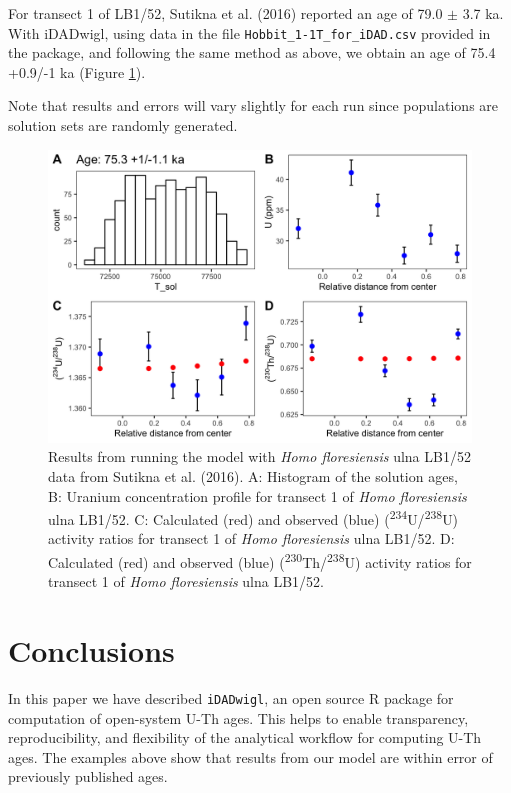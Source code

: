 \documentclass[]{elsarticle} %
\begin{document}
For transect 1 of LB1/52, Sutikna et al. (2016) reported an age of 79.0 \(\pm\) 3.7 ka. With iDADwigl, using data in the file \texttt{Hobbit\_1-1T\_for\_iDAD.csv} provided in the package, and following the same method as above, we obtain an age of 75.4 +0.9/-1 ka (Figure \ref{fig:plot-panel-hobbit-fig}).

Note that results and errors will vary slightly for each run since populations are solution sets are randomly generated.

\newpage



\begin{figure}
\includegraphics[width=0.95\linewidth]{figures/plot-panel-hobbit} \caption{Results from running the model with \emph{Homo floresiensis} ulna LB1/52 data from Sutikna et al. (2016). A: Histogram of the solution ages, B: Uranium concentration profile for transect 1 of \emph{Homo floresiensis} ulna LB1/52. C: Calculated (red) and observed (blue) (\textsuperscript{234}U/\textsuperscript{238}U) activity ratios for transect 1 of \emph{Homo floresiensis} ulna LB1/52. D: Calculated (red) and observed (blue) (\textsuperscript{230}Th/\textsuperscript{238}U) activity ratios for transect 1 of \emph{Homo floresiensis} ulna LB1/52.}\label{fig:plot-panel-hobbit-fig}
\end{figure}

\FloatBarrier

\hypertarget{conclusions}{%
\section{Conclusions}\label{conclusions}}

In this paper we have described \texttt{iDADwigl}, an open source R package for computation of open-system U-Th ages. This helps to enable transparency, reproducibility, and flexibility of the analytical workflow for computing U-Th ages. The examples above show that results from our model are within error of previously published ages.
\end{document}
